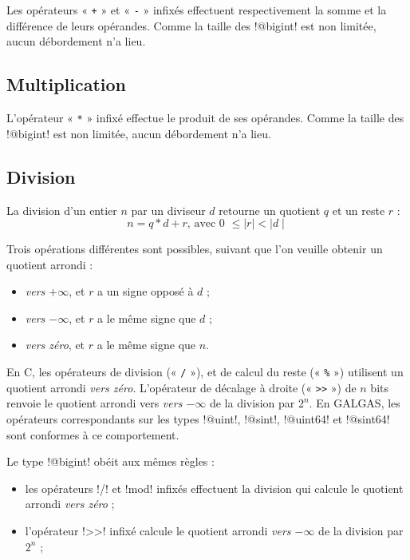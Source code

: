 Les opérateurs « \texttt{+} » et « \texttt{-} » infixés effectuent respectivement la somme et la différence de leurs opérandes. Comme la taille des \ggs!@bigint! est non limitée, aucun débordement n'a lieu.



\subsection{Multiplication}

L'opérateur « \texttt{*} » infixé effectue le produit de ses opérandes. Comme la taille des \ggs!@bigint! est non limitée, aucun débordement n'a lieu.




\subsection{Division}



La division d'un entier $n$ par un diviseur $d$ retourne un quotient $q$ et un reste $r$ :
\begin{equation*}
n = q * d + r\text{, avec 0 } \leqslant \mid r\mid < \mid d\mid
\end{equation*}

Trois opérations différentes sont possibles, suivant que l'on veuille obtenir un quotient arrondi :
\begin{itemize}
\item \emph{vers $+\infty$}, et $r$ a un signe opposé à $d$ ;
\item \emph{vers $-\infty$}, et $r$ a le même signe que $d$ ;
\item \emph{vers zéro}, et $r$ a le même signe que $n$.
\end{itemize}

En C, les opérateurs de division (« \texttt{/} »), et de calcul du reste (« \texttt{\%} ») utilisent un quotient arrondi \emph{vers zéro}. L'opérateur de décalage à droite (« \texttt{>{}>} ») de $n$ bits renvoie le quotient arrondi vers \emph{vers $-\infty$} de la division par $2^n$. En GALGAS, les opérateurs correspondants sur les types \ggs!@uint!, \ggs!@sint!, \ggs!@uint64! et \ggs!@sint64! sont conformes à ce comportement.

Le type \ggs!@bigint! obéit aux mêmes règles :
\begin{itemize}
\item les opérateurs \ggs!/! et \ggs!mod! infixés effectuent la division qui calcule le quotient arrondi \emph{vers zéro} ;
  \item l'opérateur \ggs!>>! infixé calcule le quotient arrondi \emph{vers $-\infty$} de la division par $2^n$ ;
\end{itemize}

